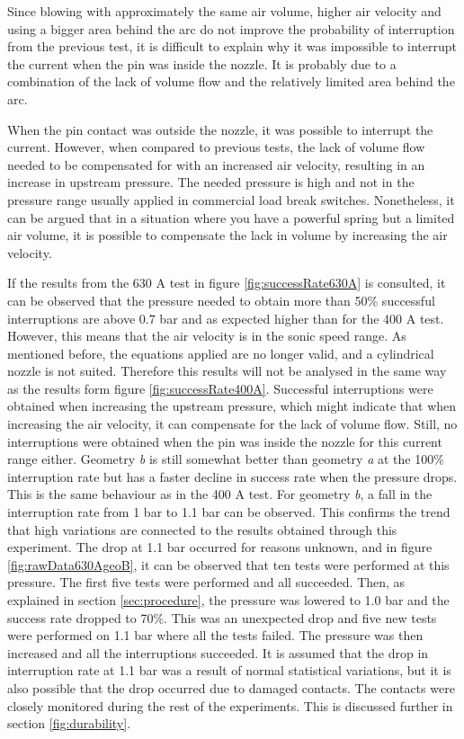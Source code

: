 \documentclass[10pt,a4paper,twoside]{article}
\begin{document}
Since blowing with approximately the same air volume, higher air velocity and using a bigger area behind the arc do not improve the probability of interruption from the previous test, it is difficult to explain why it was impossible to interrupt the current when the pin was inside the nozzle. It is probably due to a combination of the lack of volume flow and the relatively limited area behind the arc. 

When the pin contact was outside the nozzle, it was possible to interrupt the current. However, when compared to previous tests, the lack of volume flow needed to be compensated for with an increased air velocity, resulting in an increase in upstream pressure. The needed pressure is high and not in the pressure range usually applied in commercial load break switches. Nonetheless, it can be argued that in a situation where you have a powerful spring but a limited air volume, it is possible to compensate the lack in volume by increasing the air velocity.

If the results from the 630 A test in figure \ref{fig:successRate630A} is consulted, it can be observed that the pressure needed to obtain more than 50\% successful interruptions are above 0.7 bar and as expected higher than for the 400 A test. However, this means that the air velocity is in the sonic speed range. As mentioned before, the equations applied are no longer valid, and a cylindrical nozzle is not suited. Therefore this results will not be analysed in the same way as the results form figure \ref{fig:successRate400A}. Successful interruptions were obtained when increasing the upstream pressure, which might indicate that when increasing the air velocity, it can compensate for the lack of volume flow. Still, no interruptions were obtained when the pin was inside the nozzle for this current range either. Geometry \textit{b} is still somewhat better than geometry \textit{a} at the 100\% interruption rate but has a faster decline in success rate when the pressure drops. This is the same behaviour as in the 400 A test. For geometry \textit{b}, a fall in the interruption rate from 1 bar to 1.1 bar can be observed. This confirms the trend that high variations are connected to the results obtained through this experiment. The drop at 1.1 bar occurred for reasons unknown, and in figure \ref{fig:rawData630AgeoB}, it can be observed that ten tests were performed at this pressure. The first five tests were performed and all succeeded. Then, as explained in section \ref{sec:procedure}, the pressure was lowered to 1.0 bar and the success rate dropped to 70\%. This was an unexpected drop and five new tests were performed on 1.1 bar where all the tests failed. The pressure was then increased and all the interruptions succeeded. It is assumed that the drop in interruption rate at 1.1 bar was a result of normal statistical variations, but it is also possible that the drop occurred due to damaged contacts. The contacts were closely monitored during the rest of the experiments. This is discussed further in section \ref{fig:durability}.
\end{document}
